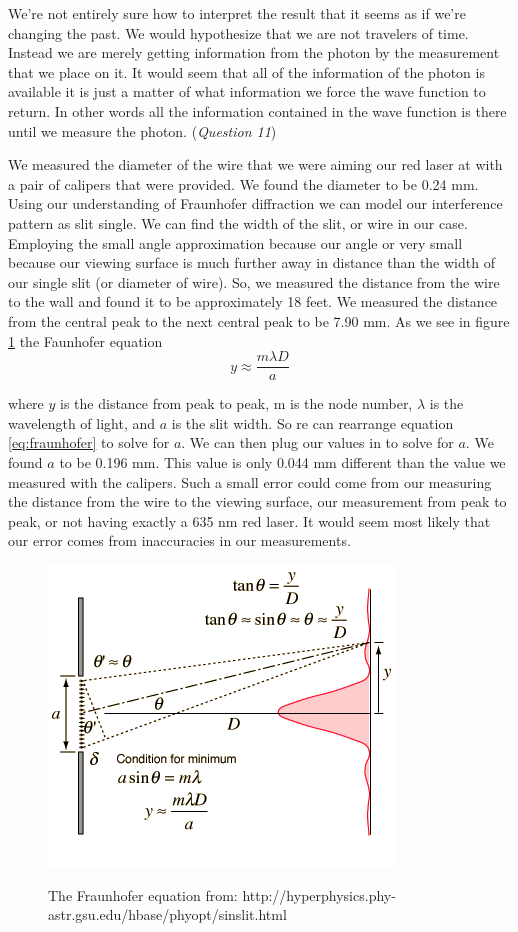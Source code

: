 \documentclass[12pt letterpaper]{article}
\begin{document}
We're not entirely sure how to interpret the result that it seems as if we're changing the past. We would hypothesize that we are not travelers of time. Instead we are merely getting information from the photon by the measurement that we place on it. It would seem that all of the information of the photon is available it is just a matter of what information we force the wave function to return. In other words all the information contained in the wave function is there until we measure the photon. 
(\textit{Question 11}) 

We measured the diameter of the wire that we were aiming our red laser at with a pair of calipers that were provided. We found the diameter to be 0.24 mm. Using our understanding of Fraunhofer diffraction we can model our interference pattern as slit single. We can find the width of the slit, or wire in our case. Employing the small angle approximation because our angle or very small because our viewing surface is much further away in distance than the width of our single slit (or diameter of wire). So, we measured the distance from the wire to the wall and found it to be approximately 18 feet. We measured the distance from the central peak to the next central peak to be 7.90 mm. As we see in figure \ref{fig:fraunhofer} the Faunhofer equation 
\begin{equation}
\label{eq:fraunhofer}
y \approx \frac{m \lambda D}{a}
\end{equation}

where $y$ is the distance from peak to peak, m is the node number, $\lambda$ is the wavelength of light, and $a$ is the slit width. So re can rearrange equation \ref{eq:fraunhofer} to solve for $a$. We can then plug our values in to solve for $a$. We found $a$ to be 0.196 mm. This value is only 0.044 mm different than the value we measured with the calipers. Such a small error could come from our measuring the distance from the wire to the viewing surface, our measurement from peak to peak, or not having exactly a 635 nm red laser. It would seem most likely that our error comes from inaccuracies in our measurements. 


\begin{figure}[H]
  \caption{The Fraunhofer equation from: http://hyperphysics.phy-astr.gsu.edu/hbase/phyopt/sinslit.html }
  \centering
    \includegraphics[width=.75\textwidth]{sinslit.png}
    \label{fig:fraunhofer}
\end{figure}
\end{document}
